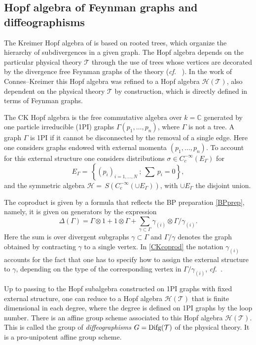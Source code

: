 \documentclass[10pt]{amsart}
\def\C{{\mathbb C}}
\def\Hc{{\mathcal H}}
\def\cT{{\mathcal T}}
\def\sT{{\mathcal T}}
\def\g{\gamma}
\def\G{\Gamma}
\def\ot{\otimes}
\def\sbs{\subset}
\newcommand{\cf}{{\it cf.\/}\ }
\numberwithin{equation}{section}
\begin{document}
\medskip
\subsection*{Hopf algebra of Feynman graphs and
diffeographisms}\hfill\medskip

The Kreimer Hopf algebra of \cite{DK1} is based on
rooted trees, which organize the hierarchy of subdivergences in
a given graph. The Hopf algebra depends on the particular physical theory
$\cT$ through the use of trees whose vertices are decorated by the
divergence free Feynman graphs of the theory (\cf \cite{DK1} \cite{CK3}).
In the work of Connes--Kreimer \cite{CK1} this Hopf algebra was
refined to a Hopf algebra $\Hc(\sT)$, also dependent on the physical
theory $\sT$ by construction, which is directly defined in terms of
Feynman graphs.

\smallskip

The CK Hopf algebra is the free commutative algebra over $k=\C$
generated by one particle irreducible (1PI) graphs
$\Gamma(p_1,\ldots,p_n)$, where $\Gamma$ is not a tree. A graph
$\Gamma$ is 1PI if it cannot be disconnected by the removal of a
single edge. Here one considers graphs endowed with external
momenta $(p_1,\ldots,p_n)$. To account for this external structure
one considers distributions $\sigma\in C_c^{-\infty}(E_\Gamma)$
for $$ E_\Gamma=\,\left\{ (p_i)_{i=1 , \ldots , N} \ ; \
 \sum \, p_i = 0 \right\}, $$
and the symmetric algebra $\Hc=\,S(C_c^{-\infty}(\cup E_\Gamma))$,
with $\cup E_\Gamma$ the disjoint union.

\smallskip

\smallskip

The coproduct is given by a formula that reflects the BP
preparation \eqref{BPprep}, namely, it is given on generators by
the expression
\begin{equation}\label{CKcoprod}
  \Delta(\G) = \G \ot 1 + 1 \ot \G + \sum_{\g \sbs \G} \g_{(i)} \ot \G /
 \g_{(i)}.
\end{equation}
Here the sum is over divergent subgraphs $\gamma \sbs \G$ and $\G
/\g$ denotes the graph obtained by contracting $\g$ to a single
vertex. In \eqref{CKcoprod} the notation $\gamma_{(i)}$ accounts
for the fact that one has to specify how to assign the external
structure to $\gamma$, depending on the type of the corresponding
vertex in $\G /
 \g_{(i)}$, \cf \cite{CK1}.

\smallskip

Up to passing to the Hopf subalgebra constructed on 1PI graphs
with fixed external structure, one can reduce to a Hopf algebra
$\Hc(\sT)$ that is finite dimensional in each degree, where the
degree is defined on 1PI graphs by the loop number. There is an
affine group scheme associated to this Hopf algebra $\Hc(\sT)$.
This is called the group of {\em diffeographisms} $G={\rm
Difg}(\sT)$ of the physical theory. It is a pro-unipotent affine
group scheme.
\end{document}

